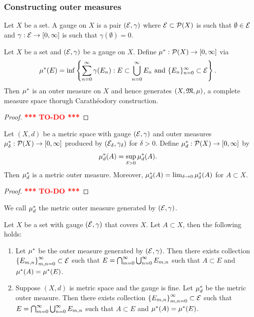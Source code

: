 \documentclass[a4paper]{article}
\newcommand{\TODO}{\textcolor{red}{\textbf{*** TO-DO ***}}}
\begin{document}
\subsubsection{Constructing outer measures}

\begin{defi}
  Let $X$ be a set. A gauge on $X$ is a pair $(\mathcal{E}, \gamma)$
  where $\mathcal{E} \subset \mathcal{P}(X)$ is such that $\emptyset
  \in \mathcal{E}$ and $\gamma : \mathcal{E} \to [0, \infty]$
  is such that $\gamma(\emptyset) = 0$.
\end{defi}

\begin{thm}
  Let $X$ be a set and $(\mathcal{E}, \gamma)$ be a gauge on $X$.
  Define $\mu^*: \mathcal{P}(X) \to [0, \infty]$ via
  \[
  \mu^*(E) = \inf \left\{ \sum_{n=0}^\infty \gamma(E_n):
  E \subset \bigcup_{n=0}^\infty E_n \text{ and }
  \{ E_n \}_{n=0}^\infty \subset \mathcal{E} \right\}.
  \]
  Then $\mu^*$ is an outer measure on $X$ and hence
  generates $(X, \mathfrak{M}, \mu)$, a complete measure space
  thorugh Carath\'eodory construction.
\end{thm}

\begin{proof}
  \TODO
\end{proof}

\begin{thm}
  Let $(X, d)$ be a metric space with gauge $(\mathcal{E}, \gamma)$
  and outer measures $\mu^*_\delta: \mathcal{P}(X) \to [0, \infty]$
  produced by $(\mathcal{E}_\delta, \gamma_\delta)$ for $\delta > 0$.
  Define $\mu^*_d : \mathcal{P}(X) \to [0, \infty]$ by
  \[
  \mu^*_d(A) = \sup_{\delta > 0} \mu^*_d (A).
  \]
  Then $\mu^*_d$ is a metric outer measure. Moreover,
  $\mu^*_d(A) = \lim_{\delta \to 0} \mu^*_\delta(A)$
  for $A \subset X$.
\end{thm}

\begin{proof}
  \TODO
\end{proof}

\begin{defi}
  We call $\mu^*_d$ the metric outer measure generated
  by $(\mathcal{E}, \gamma)$.
\end{defi}

\begin{lemma}
  Let $X$ be a set with gauge $(\mathcal{E}, \gamma)$ that covers
  $X$. Let $A \subset X$, then the following holds:
  \begin{enumerate}
    \item Let $\mu^*$ be the outer measure generated
    by $(\mathcal{E}, \gamma)$. Then there exists collection
    $\left\{ E_{m,n} \right\}_{m, n= 0}^\infty \subset \mathcal{E}$
    such that $E = \bigcap_{m=0}^\infty \bigcup_{n=0}^\infty E_{m, n}$ such that
    $A \subset E$ and $\mu^*(A) = \mu^*(E)$.

    \item Suppose $(X, d)$ is metric space and the gauge is
    fine.
    Let $\mu^*_d$ be the metric outer measure. Then there exists collection
    $\left\{ E_{m,n} \right\}_{m, n= 0}^\infty \subset \mathcal{E}$
    such that $E = \bigcap_{m=0}^\infty \bigcup_{n=0}^\infty E_{m, n}$ such that
    $A \subset E$ and $\mu^*(A) = \mu^*(E)$.
  \end{enumerate}
\end{lemma}
\end{document}
